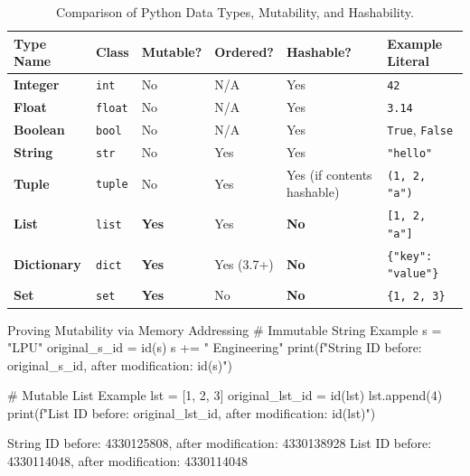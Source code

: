 \begin{table}[htbp]
\centering
\small
\renewcommand{\arraystretch}{1.3}
\begin{tabularx}{\linewidth}{lllll>{\raggedright\arraybackslash}X}
\toprule
\textbf{Type Name} & \textbf{Class} & \textbf{Mutable?} & \textbf{Ordered?} & \textbf{Hashable?} & \textbf{Example Literal} \\
\midrule
\textbf{Integer} & \texttt{int} & No & N/A & Yes & \texttt{42} \\
\textbf{Float} & \texttt{float} & No & N/A & Yes & \texttt{3.14} \\
\textbf{Boolean} & \texttt{bool} & No & N/A & Yes & \texttt{True}, \texttt{False} \\
\textbf{String} & \texttt{str} & No & Yes & Yes & \texttt{"hello"} \\
\textbf{Tuple} & \texttt{tuple} & No & Yes & Yes (if contents hashable) & \texttt{(1, 2, "a")} \\
\textbf{List} & \texttt{list} & \textbf{Yes} & Yes & \textbf{No} & \texttt{[1, 2, "a"]} \\
\textbf{Dictionary} & \texttt{dict} & \textbf{Yes} & Yes (3.7+) & \textbf{No} & \texttt{\{"key": "value"\}} \\
\textbf{Set} & \texttt{set} & \textbf{Yes} & No & \textbf{No} & \texttt{\{1, 2, 3\}} \\
\bottomrule
\end{tabularx}
\caption{Comparison of Python Data Types, Mutability, and Hashability.}
\label{tab:master-types}
\end{table}

\begin{pythoncode}[]{Proving Mutability via Memory Addressing}
# Immutable String Example
s = "LPU"
original_s_id = id(s)
s += " Engineering"
print(f"String ID before: {original_s_id}, after modification: {id(s)}")

# Mutable List Example
lst = [1, 2, 3]
original_lst_id = id(lst)
lst.append(4)
print(f"List ID before: {original_lst_id}, after modification: {id(lst)}")
\end{pythoncode}
\begin{outputbox}
String ID before: 4330125808, after modification: 4330138928
List ID before: 4330114048, after modification: 4330114048
\end{outputbox}

